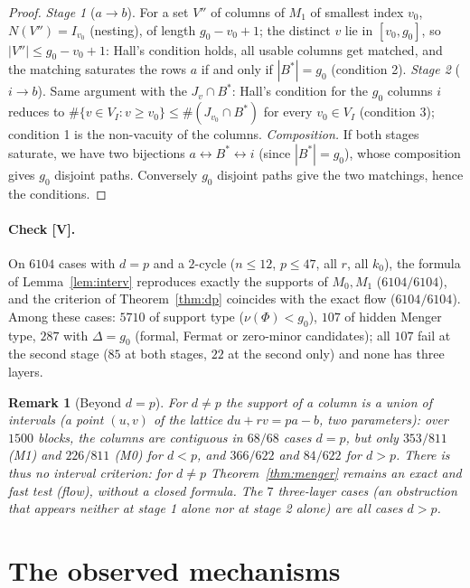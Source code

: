 \documentclass[11pt,a4paper]{article}
\newtheorem{remark}[theorem]{Remark}
\begin{document}
\begin{proof}
\emph{Stage 1} ($a\to b$). For a set $V''$ of columns of $M_1$ of smallest index
$v_0$, $N(V'')=I_{v_0}$ (nesting), of length $g_0-v_0+1$; the distinct $v$ lie in
$[v_0,g_0]$, so $|V''|\le g_0-v_0+1$: Hall's condition holds, all usable columns
get matched, and the matching saturates the rows $a$ if and only if
$|B^*|=g_0$ (condition 2). \emph{Stage 2} ($i\to b$). Same argument with the
$J_v\cap B^*$: Hall's condition for the $g_0$ columns $i$ reduces to
$\#\{v\in V_I:v\ge v_0\}\le\#(J_{v_0}\cap B^*)$ for every $v_0\in V_I$
(condition 3); condition 1 is the non-vacuity of the columns.
\emph{Composition.} If both stages saturate, we have two bijections
$a\leftrightarrow B^*\leftrightarrow i$ (since $|B^*|=g_0$), whose composition
gives $g_0$ disjoint paths. Conversely $g_0$ disjoint paths give the two
matchings, hence the conditions. \end{proof}

\paragraph{Check \textbf{[V]}.} On $6104$ cases with $d=p$ and a $2$-cycle
($n\le12$, $p\le47$, all $r$, all $k_0$), the formula of Lemma~\ref{lem:interv}
reproduces exactly the supports of $M_0,M_1$ ($6104/6104$), and the criterion of
Theorem~\ref{thm:dp} coincides with the exact flow ($6104/6104$). Among these
cases: $5710$ of support type ($\nu(\Phi)<g_0$), $107$ of hidden Menger type,
$287$ with $\Delta=g_0$ (formal, Fermat or zero-minor candidates); all $107$ fail
at the second stage ($85$ at both stages, $22$ at the second only) and none has
three layers.

\begin{remark}[Beyond $d=p$]
For $d\neq p$ the support of a column is a union of intervals (a point $(u,v)$ of
the lattice $du+rv=pa-b$, two parameters): over $1500$ blocks, the columns are
contiguous in $68/68$ cases $d=p$, but only $353/811$ (M1) and $226/811$ (M0)
for $d<p$, and $366/622$ and $84/622$ for $d>p$. There is thus no interval
criterion: for $d\neq p$ Theorem~\ref{thm:menger} remains an exact and fast test
(flow), without a closed formula. The $7$ three-layer cases (an obstruction that
appears neither at stage 1 alone nor at stage 2 alone) are all cases $d>p$.
\end{remark}

\section{The observed mechanisms}
\label{sec:meca}
\end{document}
